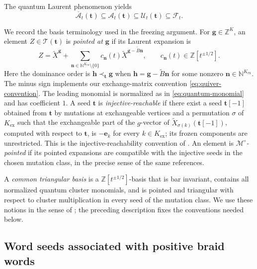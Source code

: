 \documentclass[12pt, reqno]{amsart}
\theoremstyle{plain}
\theoremstyle{definition}
\numberwithin{equation}{section}
\newcommand{\ZZ}{\mathbb{Z}}
\newcommand{\NN}{\mathbb{N}}
\begin{document}
The quantum Laurent phenomenon yields
\begin{equation}\label{eq:quantum-inclusions}
    \overline{\mathcal A}_t(\mathbf t)
    \subseteq\mathcal A_t(\mathbf t)
    \subseteq\mathcal U_t(\mathbf t)
    \subseteq\mathcal F_t.
\end{equation}

We record the basis terminology used in the freezing argument. For
\(\mathbf g\in\ZZ^K\), an element \(Z\in\mathcal T(\mathbf t)\) is
\emph{pointed at \(\mathbf g\)} if its Laurent expansion is
\begin{equation}\label{eq:pointed-element}
    Z
    =\widetilde X^{\mathbf g}
     +\sum_{\mathbf n\in\NN^{K_{\mathrm{ex}}}\setminus\{0\}}
       c_{\mathbf n}(t)
       \widetilde X^{\mathbf g-\widetilde B\mathbf n},
    \qquad
    c_{\mathbf n}(t)\in\ZZ[t^{\pm1/2}].
\end{equation}
Here the dominance order is
\(\mathbf h\prec_{\mathbf t}\mathbf g\) when
\(\mathbf h=\mathbf g-\widetilde B\mathbf n\) for some nonzero
\(\mathbf n\in\NN^{K_{\mathrm{ex}}}\). The minus sign implements
our exchange-matrix convention \eqref{eq:quiver-convention}.
The leading monomial is normalized as in
\eqref{eq:quantum-monomial} and has coefficient \(1\).
A seed \(\mathbf t\) is \emph{injective-reachable} if there exist a seed
\(\mathbf t[-1]\) obtained from \(\mathbf t\) by mutations at exchangeable
vertices and a permutation \(\sigma\) of \(K_{\mathrm{ex}}\) such that the
exchangeable part of the \(g\)-vector of
\(\widetilde X_{\sigma(k)}(\mathbf t[-1])\), computed with respect to
\(\mathbf t\), is \(-\mathbf e_k\) for every
\(k\in K_{\mathrm{ex}}\); its frozen components are unrestricted. This is
the injective-reachability convention of
\cite{qin2020dual,qin2024analogs}. An element is
\emph{\(\mathcal M^\circ\)-pointed} if its pointed expansions are compatible
with the injective seeds in the chosen mutation class, in the precise sense
of the same references.

A \emph{common triangular basis} is a
\(\ZZ[t^{\pm1/2}]\)-basis that is bar invariant, contains all normalized
quantum cluster monomials, and is pointed and triangular with respect to
cluster multiplication in every seed of the mutation class. We use these
notions in the sense of \cite{qin2020dual,qin2024analogs}; the preceding
description fixes the conventions needed below.

\subsection{Word seeds associated with positive braid words}
\end{document}
